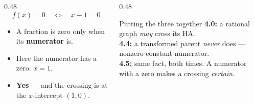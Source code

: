 \documentclass[aspectratio=169, 11pt]{beamer}
\begin{document}
\begin{frame}[t, plain]
  \begin{columns}[T]
    \begin{column}{0.48\textwidth}
      \[ f(x)=0 \quad\Longleftrightarrow\quad x-1=0 \]
      \begin{itemize}\setlength{\itemsep}{3pt}
        \item A fraction is zero only when its \textbf{numerator} is.
        \item Here the numerator has a zero: $x=1$.
        \item \textbf{Yes} --- and the crossing is at the $x$-intercept $(1,0)$.
      \end{itemize}
    \end{column}
    \begin{column}{0.48\textwidth}
      \begin{block}{Putting the three together}
        \textbf{4.0:} a rational graph \emph{may} cross its HA. \\[3pt]
        \textbf{4.4:} a transformed parent \emph{never} does --- nonzero constant numerator. \\[3pt]
        \textbf{4.5:} same fact, both times. A numerator with a zero makes a crossing
        \emph{certain}.
      \end{block}
    \end{column}
  \end{columns}
\end{frame}
\end{document}

